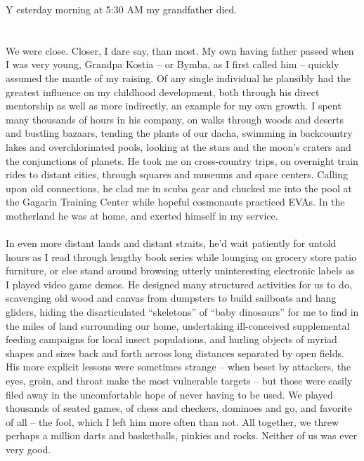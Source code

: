 \documentclass[twoside,10pt]{article}
\begin{document}
\begin{article*}
\lettrine{Y}{} esterday morning at 5:30 AM my grandfather died.\textcolor{white}{. . . . . . . . . . . . . . . . . . . . . . . . . . }
\\\\
We were close. Closer, I dare say, than most. My own having father passed when I was very young, Grandpa Kostia – or Bymba, as I first called him – quickly assumed the mantle of my raising. Of any single individual he plausibly had the greatest influence on my childhood development, both through his direct mentorship as well as more indirectly, an example for my own growth. I spent many thousands of hours in his company, on walks through woods and deserts and bustling bazaars, tending the plants of our dacha, swimming in backcountry lakes and overchlorinated pools, looking at the stars and the moon’s craters and the conjunctions of planets. He took me on cross-country trips, on overnight train rides to distant cities, through squares and museums and space centers. Calling upon old connections, he clad me in scuba gear and chucked me into the pool at the Gagarin Training Center while hopeful cosmonauts practiced EVAs. In the motherland he was at home, and exerted himself in my service.
\\\\
In even more distant lands and distant straits, he’d wait patiently for untold hours as I read through lengthy book series while lounging on grocery store patio furniture, or else stand around browsing utterly uninteresting electronic labels as I played video game demos. He designed many structured activities for us to do, scavenging old wood and canvas from dumpsters to build sailboats and hang gliders, hiding the disarticulated “skeletons” of “baby dinosaurs” for me to find in the miles of land surrounding our home, undertaking ill-conceived supplemental feeding campaigns for local insect populations, and hurling objects of myriad shapes and sizes back and forth across long distances separated by open fields. His more explicit lessons were sometimes strange – when beset by attackers, the eyes, groin, and throat make the most vulnerable targets – but those were easily filed away in the uncomfortable hope of never having to be used. We played thousands of seated games, of chess and checkers, dominoes and go, and favorite of all – the fool, which I left him more often than not. All together, we threw perhaps a million darts and basketballs, pinkies and rocks. Neither of us was ever very good. 
\\\\

\end{article*}
\end{document}
